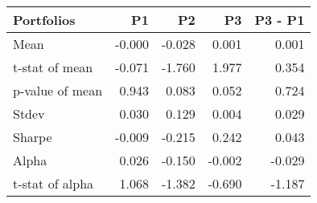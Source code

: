 \begin{tabular}{lrrrr}
\toprule
Portfolios & P1 & P2 & P3 & P3 - P1 \\
\midrule
Mean & -0.000 & -0.028 & 0.001 & 0.001 \\
t-stat of mean & -0.071 & -1.760 & 1.977 & 0.354 \\
p-value of mean & 0.943 & 0.083 & 0.052 & 0.724 \\
Stdev & 0.030 & 0.129 & 0.004 & 0.029 \\
Sharpe & -0.009 & -0.215 & 0.242 & 0.043 \\
Alpha & 0.026 & -0.150 & -0.002 & -0.029 \\
t-stat of alpha & 1.068 & -1.382 & -0.690 & -1.187 \\
\bottomrule
\end{tabular}
